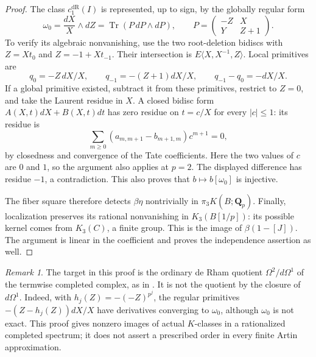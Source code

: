 \documentclass[11pt,a4paper]{article}
\theoremstyle{remark}
\newtheorem{remark}[theorem]{Remark}
\begin{document}
\begin{proof}
The class $c_1^{\mathrm{dR}}(I)$ is represented, up to sign, by the
globally regular form
\[
 \omega_0=\frac{dX}{X}\wedge dZ
 =\operatorname{Tr}(P\,dP\wedge dP),\qquad
 P=\begin{pmatrix}-Z&X\\Y&Z+1\end{pmatrix}.
\]
To verify its algebraic nonvanishing, use the two root-deletion
bidiscs with $Z=Xt_0$ and $Z=-1+Xt_{-1}$. Their intersection is
$E\langle X,X^{-1},Z\rangle$. Local primitives are
\[
 q_0=-Z\,dX/X,\qquad q_{-1}=-(Z+1)dX/X,
 \qquad q_{-1}-q_0=-dX/X.
\]
If a global primitive existed, subtract it from these primitives,
restrict to $Z=0$, and take the Laurent residue in $X$. A closed
bidisc form $A(X,t)dX+B(X,t)dt$ has zero residue on $t=c/X$ for
every $|c|\le1$: its residue is
\[
 \sum_{m\ge0}(a_{m,m+1}-b_{m+1,m})c^{m+1}=0,
\]
by closedness and convergence of the Tate coefficients. Here the
two values of $c$ are $0$ and $1$, so the argument also applies at
$p=2$. The displayed difference has residue $-1$, a contradiction.
This also proves that $b\mapsto b[\omega_0]$ is injective.

The fiber square therefore detects $\beta\eta$ nontrivially in
$\pi_3K(B;\mathbf Q_p)$. Finally, localization preserves its rational
nonvanishing in $K_3(B[1/p])$: its possible kernel comes from
$K_3(C)$, a finite group. This is the image of $\beta(1-[J])$.
The argument is linear in the coefficient and proves the independence
assertion as well.
\end{proof}

\begin{remark}
The target in this proof is the ordinary de Rham quotient
$\Omega^2/d\Omega^1$ of the termwise completed complex, as in
\cite[Constructions~4.6 and~4.11]{AMMN}. It is not the quotient by
the closure of $d\Omega^1$. Indeed, with
$h_j(Z)=-(-Z)^{p^j}$, the regular primitives
$-(Z-h_j(Z))dX/X$ have derivatives converging to $\omega_0$, although
$\omega_0$ is not exact. This proof gives nonzero images of actual
$K$-classes in a rationalized completed spectrum; it does not assert
a prescribed order in every finite Artin approximation.
\end{remark}


\end{document}
